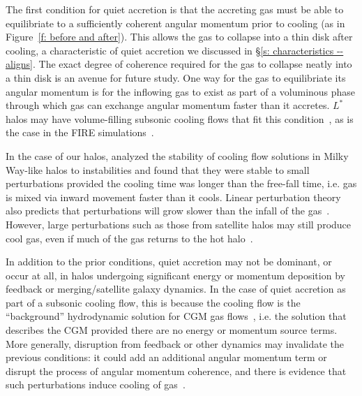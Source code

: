 \documentclass[fleqn,usenatbib]{mnras}
\begin{document}
The first condition for quiet accretion is that the accreting gas must be able to equilibriate to a sufficiently coherent angular momentum prior to cooling (as in Figure~\ref{f: before and after}).
This allows the gas to collapse into a thin disk after cooling, a characteristic of quiet accretion we discussed in \S\ref{s: characteristics -- aligns}.
The exact degree of coherence required for the gas to collapse neatly into a thin disk is an avenue for future study.
One way for the gas to equilibriate its angular momentum is for the inflowing gas to exist as part of a voluminous phase through which gas can exchange angular momentum faster than it accretes.
$L^*$ halos may have volume-filling subsonic cooling flows that fit this condition~\citep{Stern2019}, as is the case in the FIRE simulations~\citep{Stern2020a}.

In the case of our halos, \cite{Stern2019} analyzed the stability of cooling flow solutions in Milky Way-like halos to instabilities and found that they were stable to small perturbations provided the cooling time was longer than the free-fall time, i.e. gas is mixed via inward movement faster than it cools.
Linear perturbation theory also predicts that perturbations will grow slower than the infall of the gas~\citep[e.g.][]{Balbus1989}.
However, large perturbations such as those from satellite halos may still produce cool gas, even if much of the gas returns to the hot halo~\citep{Esmerian2020}.

In addition to the prior conditions, quiet accretion may not be dominant, or occur at all, in halos undergoing significant energy or momentum deposition by feedback or merging/satellite galaxy dynamics.
In the case of quiet accretion as part of a subsonic cooling flow, this is because the cooling flow is the ``background'' hydrodynamic solution for CGM gas flows~\cite{Stern2019}, i.e. the solution that describes the CGM provided there are no energy or momentum source terms.
More generally, disruption from feedback or other dynamics may invalidate the previous conditions: it could add an additional angular momentum term or disrupt the process of angular momentum coherence, and there is evidence that such perturbations induce cooling of gas~\citep[e.g.][]{Hummels2019, Esmerian2020}.
\end{document}
